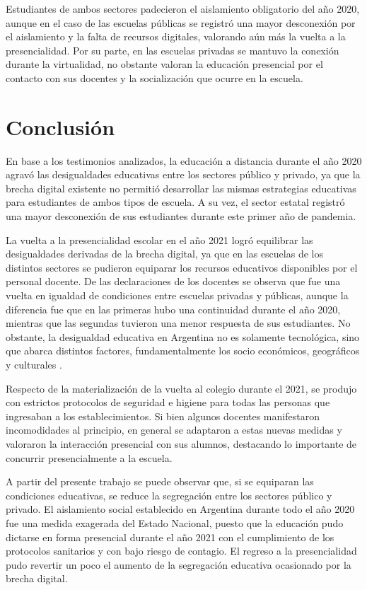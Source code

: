 \documentclass[spanish]{textolivre}
\begin{document}
Estudiantes de ambos sectores padecieron el aislamiento obligatorio del año 2020, aunque en el caso de las escuelas públicas se registró una mayor desconexión por el aislamiento y la falta de recursos digitales, valorando aún más la vuelta a la presencialidad. Por su parte, en las escuelas privadas se mantuvo la conexión durante la virtualidad, no obstante valoran la educación presencial por el contacto con sus docentes y la socialización que ocurre en la escuela.

\section{Conclusión}\label{sec-secoes}
En base a los testimonios analizados, la educación a distancia durante el año 2020 agravó las desigualdades educativas entre los sectores público y privado, ya que la brecha digital existente no permitió desarrollar las mismas estrategias educativas para estudiantes de ambos tipos de escuela. A su vez, el sector estatal registró una mayor desconexión de sus estudiantes durante este primer año de pandemia.

La vuelta a la presencialidad escolar en el año 2021 logró equilibrar las desigualdades derivadas de la brecha digital, ya que en las escuelas de los distintos sectores se pudieron equiparar los recursos educativos disponibles por el personal docente. De las declaraciones de los docentes se observa que fue una vuelta en igualdad de condiciones entre escuelas privadas y públicas, aunque la diferencia fue que en las primeras hubo una continuidad durante el año 2020, mientras que las segundas tuvieron una menor respuesta de sus estudiantes. No obstante, la desigualdad educativa en Argentina no es solamente tecnológica, sino que abarca distintos factores, fundamentalmente los socio económicos, geográficos y culturales \cite{formichella_condiciones_2019}.

Respecto de la materialización de la vuelta al colegio durante el 2021, se produjo con estrictos protocolos de seguridad e higiene para todas las personas que ingresaban a los establecimientos. Si bien algunos docentes manifestaron incomodidades al principio, en general se adaptaron a estas nuevas medidas y valoraron la interacción presencial con sus alumnos, destacando lo importante de concurrir presencialmente a la escuela.

A partir del presente trabajo se puede observar que, si se equiparan las condiciones educativas, se reduce la segregación entre los sectores público y privado. El aislamiento social establecido en Argentina durante todo el año 2020 fue una medida exagerada del Estado Nacional, puesto que la educación pudo dictarse en forma presencial durante el año 2021 con el cumplimiento de los protocolos sanitarios y con bajo riesgo de contagio. El regreso a la presencialidad pudo revertir un poco el aumento de la segregación educativa ocasionado por la brecha digital.

\printbibliography\label{sec-bib}
\end{document}
